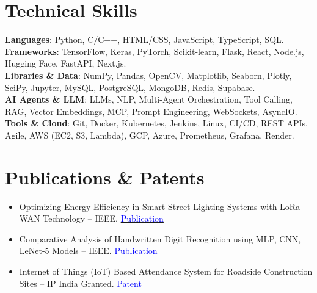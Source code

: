 \documentclass[a4paper,11pt]{article}
\newcommand{\resumeItemListStart}{\begin{itemize}[leftmargin=1.5em, rightmargin=0.2em, itemsep=-1pt, parsep=0pt, topsep=2pt]}
\newcommand{\resumeItemListEnd}{\end{itemize}\vspace{-5pt}}
\newcommand{\resumeItem}[1]{\item\small{#1}}
\begin{document}
\section{Technical Skills}
\begin{itemize}[leftmargin=0.1in, label={}]
  \small{\item{
    \textbf{Languages}{: Python, C/C++, HTML/CSS, JavaScript, TypeScript, SQL.} \\
    \textbf{Frameworks}{: TensorFlow, Keras, PyTorch, Scikit-learn, Flask, React, Node.js, Hugging Face, FastAPI, Next.js.} \\
    \textbf{Libraries \& Data}{: NumPy, Pandas, OpenCV, Matplotlib, Seaborn, Plotly, SciPy, Jupyter, MySQL, PostgreSQL, MongoDB, Redis, Supabase.} \\
    \textbf{AI Agents \& LLM}{: LLMs, NLP, Multi-Agent Orchestration, Tool Calling, RAG, Vector Embeddings, MCP, Prompt Engineering, WebSockets, AsyncIO.} \\
    \textbf{Tools \& Cloud}{: Git, Docker, Kubernetes, Jenkins, Linux, CI/CD, REST APIs, Agile, AWS (EC2, S3, Lambda), GCP, Azure, Prometheus, Grafana, Render.} \\
  }}
\end{itemize}
\vspace{-25pt}

\section{Publications \& Patents}
\resumeItemListStart
  \resumeItem{Optimizing Energy Efficiency in Smart Street Lighting Systems with LoRa WAN Technology -- IEEE. \hfill \href{https://ieeexplore.ieee.org/document/10527564}{\textcolor{blue}{Publication}}}
  \resumeItem{Comparative Analysis of Handwritten Digit Recognition using MLP, CNN, LeNet-5 Models -- IEEE. \hfill \href{https://ieeexplore.ieee.org/document/10939547}{\textcolor{blue}{Publication}}}
  \resumeItem{Internet of Things (IoT) Based Attendance System for Roadside Construction Sites -- IP India Granted. \hfill \href{https://drive.google.com/file/d/1zTYg7hnRU_YZuY8qC2AFABGL-V3i2Cie/view?usp=sharing}{\textcolor{blue}{Patent}}}
\resumeItemListEnd
\end{document}
